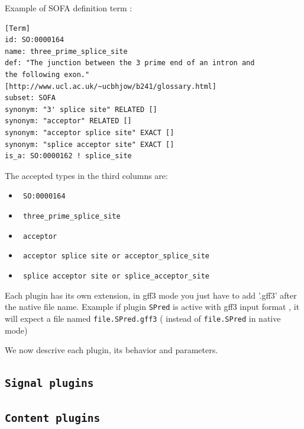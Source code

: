 \documentclass[a4paper,titlepage]{report}
\begin{document}
Example of SOFA definition term :
\begin{Verbatim}
[Term]
id: SO:0000164
name: three_prime_splice_site
def: "The junction between the 3 prime end of an intron and 
the following exon." [http://www.ucl.ac.uk/~ucbhjow/b241/glossary.html]
subset: SOFA
synonym: "3' splice site" RELATED []
synonym: "acceptor" RELATED []
synonym: "acceptor splice site" EXACT []
synonym: "splice acceptor site" EXACT []
is_a: SO:0000162 ! splice_site
\end{Verbatim}

The accepted types in the third columns are:

\begin{itemize}
\item\texttt{ SO:0000164}
\item\texttt{ three\_prime\_splice\_site}
\item\texttt{ acceptor }
\item\texttt{ acceptor splice site or  acceptor\_splice\_site}
\item\texttt{ splice acceptor site or  splice\_acceptor\_site}
\end{itemize}

Each plugin has its own extension, in gff3 mode you just have to add '.gff3' after the native file name.
Example if plugin \texttt{SPred} is active with gff3 input format , it will expect 
a file named \texttt{file.SPred.gff3} ( instead of \texttt{file.SPred} in native mode)

We now descrive each plugin, its behavior and parameters.

\subsection{\texttt{Signal plugins}}
















\subsection{\texttt{Content plugins}}








\end{document}
